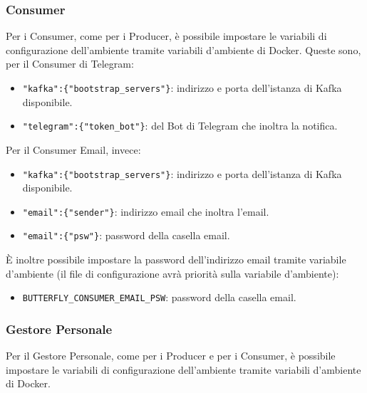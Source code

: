 	\subsubsection{Consumer}\label{var_consumer}
	Per i Consumer, come per i Producer, è possibile impostare le variabili di configurazione dell'ambiente tramite variabili d'ambiente di Docker.
	Queste sono, per il Consumer di Telegram:
	\begin{itemize}
		\item\texttt{"kafka":\{"bootstrap\_servers"\}}: indirizzo e porta dell'istanza di Kafka disponibile.
		\item\texttt{"telegram":\{"token\_bot"\}}:  del Bot di Telegram che inoltra la notifica.
	\end{itemize}

	Per il Consumer Email, invece:
	\begin{itemize}
		\item\texttt{"kafka":\{"bootstrap\_servers"\}}: indirizzo e porta dell'istanza di Kafka disponibile.
		\item\texttt{"email":\{"sender"\}}: indirizzo email che inoltra l'email.
		\item\texttt{"email":\{"psw"\}}: password della casella email.
	\end{itemize}

	È inoltre possibile impostare la password dell'indirizzo email tramite variabile d'ambiente (il file di configurazione avrà priorità sulla variabile d'ambiente):
	\begin{itemize}
		\item\texttt{BUTTERFLY\_CONSUMER\_EMAIL\_PSW}: password della casella email.
	\end{itemize}

	\subsubsection{Gestore Personale}
	Per il Gestore Personale, come per i Producer e per i Consumer, è possibile impostare le variabili di configurazione dell'ambiente tramite variabili d'ambiente di Docker. \par

